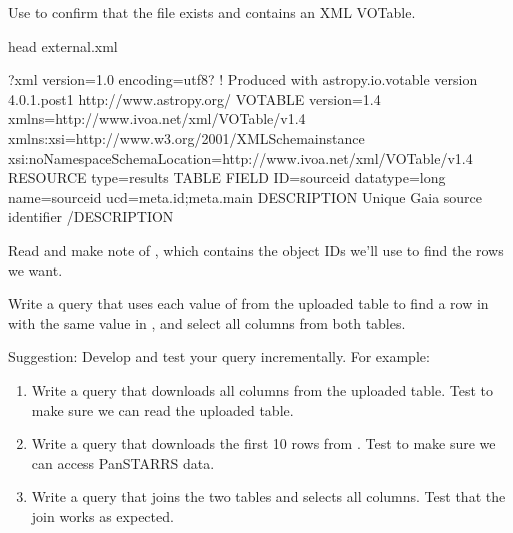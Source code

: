 \documentclass[letterpaper,10pt,english]{sphinxmanual}
\begin{document}
Use  to confirm that the file exists and contains an XML VOTable.

\begin{sphinxVerbatim}[commandchars=\\\{\}]
head external.xml
\end{sphinxVerbatim}

\begin{sphinxVerbatim}[commandchars=\\\{\}]
\PYGZlt{}?xml version=\PYGZdq{}1.0\PYGZdq{} encoding=\PYGZdq{}utf\PYGZhy{}8\PYGZdq{}?\PYGZgt{}
\PYGZlt{}!\PYGZhy{}\PYGZhy{} Produced with astropy.io.votable version 4.0.1.post1
     http://www.astropy.org/ \PYGZhy{}\PYGZhy{}\PYGZgt{}
\PYGZlt{}VOTABLE version=\PYGZdq{}1.4\PYGZdq{} xmlns=\PYGZdq{}http://www.ivoa.net/xml/VOTable/v1.4\PYGZdq{} xmlns:xsi=\PYGZdq{}http://www.w3.org/2001/XMLSchema\PYGZhy{}instance\PYGZdq{} xsi:noNamespaceSchemaLocation=\PYGZdq{}http://www.ivoa.net/xml/VOTable/v1.4\PYGZdq{}\PYGZgt{}
 \PYGZlt{}RESOURCE type=\PYGZdq{}results\PYGZdq{}\PYGZgt{}
  \PYGZlt{}TABLE\PYGZgt{}
   \PYGZlt{}FIELD ID=\PYGZdq{}source\PYGZus{}id\PYGZdq{} datatype=\PYGZdq{}long\PYGZdq{} name=\PYGZdq{}source\PYGZus{}id\PYGZdq{} ucd=\PYGZdq{}meta.id;meta.main\PYGZdq{}\PYGZgt{}
    \PYGZlt{}DESCRIPTION\PYGZgt{}
     Unique Gaia source identifier
    \PYGZlt{}/DESCRIPTION\PYGZgt{}
\end{sphinxVerbatim}

 Read  and make note of , which contains the object IDs we’ll use to find the rows we want.

Write a query that uses each value of  from the uploaded table to find a row in  with the same value in , and select all columns from both tables.

Suggestion: Develop and test your query incrementally.  For example:
\begin{enumerate}
%
\item {} 
Write a query that downloads all columns from the uploaded table.  Test to make sure we can read the uploaded table.

\item {} 
Write a query that downloads the first 10 rows from .  Test to make sure we can access Pan\sphinxhyphen{}STARRS data.

\item {} 
Write a query that joins the two tables and selects all columns.  Test that the join works as expected.

\end{enumerate}
\end{document}
